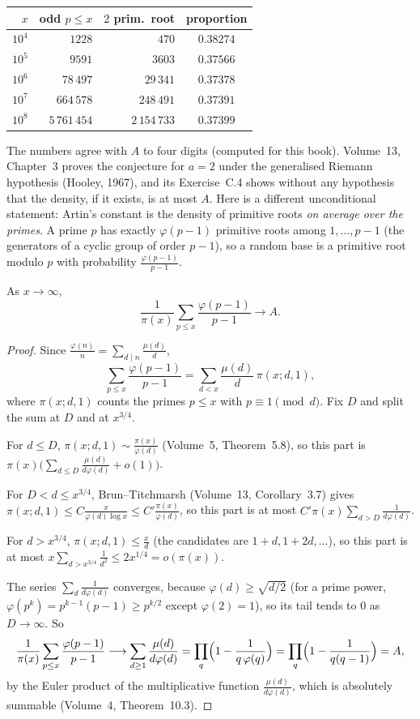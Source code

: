 \begin{center}\small
\begin{tabular}{rrrc}
$x$&odd $p\le x$&$2$ prim.\ root&proportion\\\hline
$10^4$&$1228$&$470$&$0.38274$\\
$10^5$&$9591$&$3603$&$0.37566$\\
$10^6$&$78\,497$&$29\,341$&$0.37378$\\
$10^7$&$664\,578$&$248\,491$&$0.37391$\\
$10^8$&$5\,761\,454$&$2\,154\,733$&$0.37399$
\end{tabular}
\end{center}

The numbers agree with $A$ to four digits (computed for this book). Volume~13, Chapter~3 proves the conjecture for $a=2$ under the generalised Riemann
hypothesis (Hooley, 1967), and its Exercise~C.4 shows without any hypothesis that the density, if it exists, is at most $A$. Here is a different unconditional
statement: Artin's constant is the density of primitive roots \emph{on average over the primes}. A prime $p$ has exactly $\varphi(p-1)$ primitive roots among
$1,\dots,p-1$ (the generators of a cyclic group of order $p-1$), so a random base is a primitive root modulo $p$ with probability $\frac{\varphi(p-1)}{p-1}$.

\begin{theorem}\label{conjectures:thm:artinavg}
As $x\to\infty$,
\[
\frac1{\pi(x)}\sum_{p\le x}\frac{\varphi(p-1)}{p-1}\longrightarrow A.
\]
\end{theorem}
\begin{proof}
Since $\frac{\varphi(n)}n=\sum_{d\mid n}\frac{\mu(d)}d$,
\[
\sum_{p\le x}\frac{\varphi(p-1)}{p-1}=\sum_{d<x}\frac{\mu(d)}d\,\pi(x;d,1),
\]
where $\pi(x;d,1)$ counts the primes $p\le x$ with $p\equiv1\pmod d$. Fix $D$ and split the sum at $D$ and at $x^{3/4}$.

For $d\le D$, $\pi(x;d,1)\sim\frac{\pi(x)}{\varphi(d)}$ (Volume~5, Theorem~5.8), so this part is $\pi(x)\bigl(\sum_{d\le D}\frac{\mu(d)}{d\varphi(d)}+o(1)\bigr)$.

For $D<d\le x^{3/4}$, Brun--Titchmarsh (Volume~13, Corollary~3.7) gives $\pi(x;d,1)\le C\frac x{\varphi(d)\log x}\le C'\frac{\pi(x)}{\varphi(d)}$, so this part is at
most $C'\pi(x)\sum_{d>D}\frac1{d\varphi(d)}$.

For $d>x^{3/4}$, $\pi(x;d,1)\le\frac xd$ (the candidates are $1+d,1+2d,\dots$), so this part is at most $x\sum_{d>x^{3/4}}\frac1{d^2}\le2x^{1/4}=o(\pi(x))$.

The series $\sum_d\frac1{d\varphi(d)}$ converges, because $\varphi(d)\ge\sqrt{d/2}$ (for a prime power, $\varphi(p^k)=p^{k-1}(p-1)\ge p^{k/2}$ except $\varphi(2)=1$), so its tail tends to $0$ as $D\to\infty$. So
\[
\frac1{\pi(x)}\sum_{p\le x}\frac{\varphi(p-1)}{p-1}\longrightarrow\sum_{d\ge1}\frac{\mu(d)}{d\varphi(d)}=\prod_q\Bigl(1-\frac1{q\,\varphi(q)}\Bigr)=\prod_q\Bigl(1-\frac1{q(q-1)}\Bigr)=A,
\]
by the Euler product of the multiplicative function $\frac{\mu(d)}{d\varphi(d)}$, which is absolutely summable (Volume~4, Theorem~10.3).
\end{proof}

